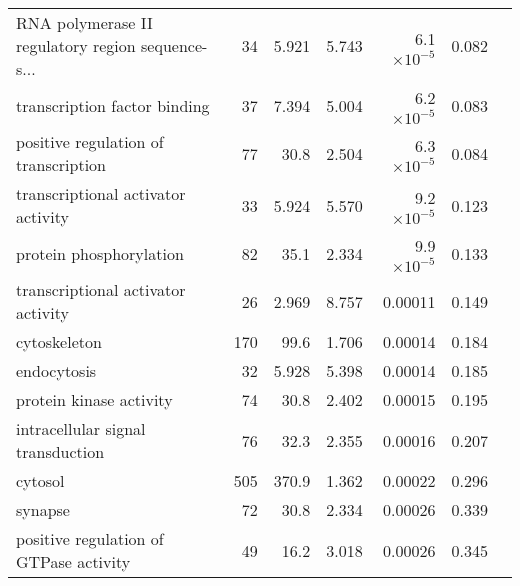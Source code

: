 \begin{longtable}{|l|r|r|r|r|r|}
 RNA polymerase II regulatory region sequence-s... &                      34 &                   5.921 &      5.743 &  6.1$\times 10^{-5}$ &                        0.082~~ \\
                      transcription factor binding &                      37 &                   7.394 &      5.004 &  6.2$\times 10^{-5}$ &                        0.083~~ \\
              positive regulation of transcription &                      77 &                    30.8 &      2.504 &  6.3$\times 10^{-5}$ &                        0.084~~ \\
                transcriptional activator activity &                      33 &                   5.924 &      5.570 &  9.2$\times 10^{-5}$ &                        0.123~~ \\
                           protein phosphorylation &                      82 &                    35.1 &      2.334 &  9.9$\times 10^{-5}$ &                        0.133~~ \\
                transcriptional activator activity &                      26 &                   2.969 &      8.757 &              0.00011 &                        0.149~~ \\
                                      cytoskeleton &                     170 &                    99.6 &      1.706 &              0.00014 &                        0.184~~ \\
                                       endocytosis &                      32 &                   5.928 &      5.398 &              0.00014 &                        0.185~~ \\
                           protein kinase activity &                      74 &                    30.8 &      2.402 &              0.00015 &                        0.195~~ \\
                 intracellular signal transduction &                      76 &                    32.3 &      2.355 &              0.00016 &                        0.207~~ \\
                                           cytosol &                     505 &                   370.9 &      1.362 &              0.00022 &                        0.296~~ \\
                                           synapse &                      72 &                    30.8 &      2.334 &              0.00026 &                        0.339~~ \\
            positive regulation of GTPase activity &                      49 &                    16.2 &      3.018 &              0.00026 &                        0.345~~ \\

\end{longtable}
